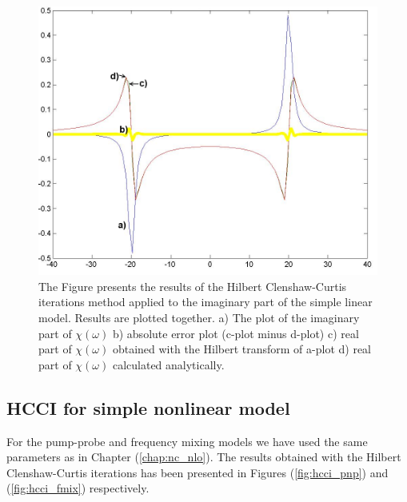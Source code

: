 \documentclass[12pt,twoside,a4paper]{article}
\numberwithin{equation}{subsection}
\numberwithin{figure}{subsection}
\begin{document}
\begin{figure} 
  \includegraphics[width=150mm]{img/hcc_lin2.png}
  \caption{The Figure presents the results of the Hilbert Clenshaw-Curtis iterations method applied to the imaginary part of the simple linear model. Results are plotted together.
   a) The plot of the imaginary part of $\chi (\omega )$ 
   b) absolute error plot (c-plot minus d-plot) 
   c) real part of $\chi (\omega )$ obtained with the Hilbert transform of a-plot 
   d) real part of $\chi (\omega )$ calculated analytically. \label{fig:cci_lin2}
  }
\end{figure}

\subsection{HCCI for simple nonlinear model} \label{chap:hcc_nlo}

For the pump-probe and frequency mixing models we have used the same parameters as in Chapter (\ref{chap:nc_nlo}). The results obtained with the Hilbert Clenshaw-Curtis iterations has been presented in Figures (\ref{fig:hcci_pnp}) and (\ref{fig:hcci_fmix}) respectively.
\end{document}
